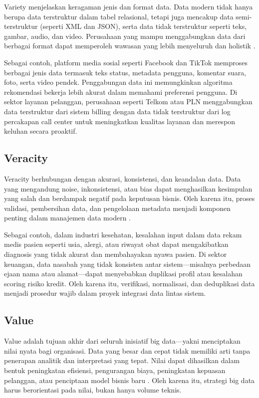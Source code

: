 Variety menjelaskan keragaman jenis dan format data. Data modern tidak hanya berupa data terstruktur dalam tabel relasional, tetapi juga mencakup data semi-terstruktur (seperti XML dan JSON), serta data tidak terstruktur seperti teks, gambar, audio, dan video. Perusahaan yang mampu menggabungkan data dari berbagai format dapat memperoleh wawasan yang lebih menyeluruh dan holistik \cite{gandomi2015}.

Sebagai contoh, platform media sosial seperti Facebook dan TikTok memproses berbagai jenis data termasuk teks status, metadata pengguna, komentar suara, foto, serta video pendek. Penggabungan data ini memungkinkan algoritma rekomendasi bekerja lebih akurat dalam memahami preferensi pengguna. Di sektor layanan pelanggan, perusahaan seperti Telkom atau PLN menggabungkan data terstruktur dari sistem billing dengan data tidak terstruktur dari log percakapan call center untuk meningkatkan kualitas layanan dan merespon keluhan secara proaktif.

\subsection{Veracity}

Veracity berhubungan dengan akurasi, konsistensi, dan keandalan data. Data yang mengandung noise, inkonsistensi, atau bias dapat menghasilkan kesimpulan yang salah dan berdampak negatif pada keputusan bisnis. Oleh karena itu, proses validasi, pembersihan data, dan pengelolaan metadata menjadi komponen penting dalam manajemen data modern \cite{sadiq2017}.

Sebagai contoh, dalam industri kesehatan, kesalahan input dalam data rekam medis pasien seperti usia, alergi, atau riwayat obat dapat mengakibatkan diagnosis yang tidak akurat dan membahayakan nyawa pasien. Di sektor keuangan, data nasabah yang tidak konsisten antar sistem—misalnya perbedaan ejaan nama atau alamat—dapat menyebabkan duplikasi profil atau kesalahan scoring risiko kredit. Oleh karena itu, verifikasi, normalisasi, dan deduplikasi data menjadi prosedur wajib dalam proyek integrasi data lintas sistem.

\subsection{Value}

Value adalah tujuan akhir dari seluruh inisiatif big data—yakni menciptakan nilai nyata bagi organisasi. Data yang besar dan cepat tidak memiliki arti tanpa penerapan analitik dan interpretasi yang tepat. Nilai dapat dihasilkan dalam bentuk peningkatan efisiensi, pengurangan biaya, peningkatan kepuasan pelanggan, atau penciptaan model bisnis baru \cite{waller2013}. Oleh karena itu, strategi big data harus berorientasi pada nilai, bukan hanya volume teknis.

